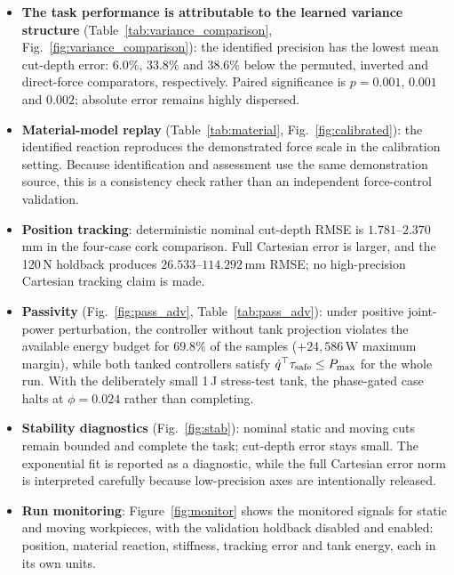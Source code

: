\documentclass[11pt,a4paper]{article}
\begin{document}
\begin{itemize}[leftmargin=1.5em]
\item \textbf{The task performance is attributable to the learned variance
structure} (Table~\ref{tab:variance_comparison},
Fig.~\ref{fig:variance_comparison}): the identified
precision has the lowest mean cut-depth error: $6.0\%$, $33.8\%$ and $38.6\%$
below the permuted, inverted and direct-force comparators, respectively.
Paired significance is $p=0.001$, $0.001$ and $0.002$; absolute error remains
highly dispersed.
\item \textbf{Material-model replay} (Table~\ref{tab:material},
Fig.~\ref{fig:calibrated}): the identified reaction reproduces the demonstrated
force scale in the calibration setting. Because identification and assessment
use the same demonstration source, this is a consistency check rather than an
independent force-control validation.
\item \textbf{Position tracking}: deterministic nominal cut-depth RMSE is
$1.781$--$2.370$\,mm in the four-case cork comparison. Full Cartesian error is
larger, and the 120\,N holdback produces $26.533$--$114.292$\,mm RMSE; no
high-precision Cartesian tracking claim is made.
\item \textbf{Passivity} (Fig.~\ref{fig:pass_adv}, Table~\ref{tab:pass_adv}):
under positive joint-power perturbation, the controller without tank projection
violates the available energy budget for $69.8\%$ of the samples
($+24{,}586$\,W maximum margin), while both tanked controllers satisfy
$\dot q^\top\tau_{\rm safe}\le P_{\max}$ for the whole run. With the deliberately
small 1\,J stress-test tank, the phase-gated case halts at $\phi=0.024$ rather
than completing.
\item \textbf{Stability diagnostics} (Fig.~\ref{fig:stab}): nominal static and
moving cuts remain bounded and complete the task; cut-depth error stays small.
The exponential fit is reported as a diagnostic, while the full Cartesian error
norm is interpreted carefully because low-precision axes are intentionally
released.
\item \textbf{Run monitoring}: Figure~\ref{fig:monitor} shows the monitored
signals for static and moving workpieces, with the validation holdback disabled
and enabled: position, material reaction, stiffness, tracking error and tank
energy, each in its own units.
\end{itemize}
\end{document}
